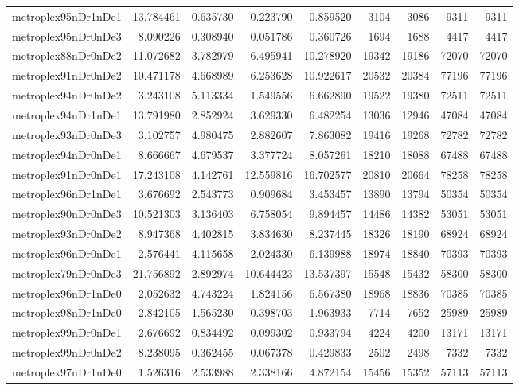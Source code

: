 \begin{longtable}{|l|r|r|r|r|r|r|r|r|}
metroplex95nDr1nDe1 & 13.784461 & 0.635730 & 0.223790 & 0.859520 & 3104 & 3086 & 9311 & 9311 \\
metroplex95nDr0nDe3 & 8.090226 & 0.308940 & 0.051786 & 0.360726 & 1694 & 1688 & 4417 & 4417 \\
metroplex88nDr0nDe2 & 11.072682 & 3.782979 & 6.495941 & 10.278920 & 19342 & 19186 & 72070 & 72070 \\
metroplex91nDr0nDe2 & 10.471178 & 4.668989 & 6.253628 & 10.922617 & 20532 & 20384 & 77196 & 77196 \\
metroplex94nDr0nDe2 & 3.243108 & 5.113334 & 1.549556 & 6.662890 & 19522 & 19380 & 72511 & 72511 \\
metroplex94nDr1nDe1 & 13.791980 & 2.852924 & 3.629330 & 6.482254 & 13036 & 12946 & 47084 & 47084 \\
metroplex93nDr0nDe3 & 3.102757 & 4.980475 & 2.882607 & 7.863082 & 19416 & 19268 & 72782 & 72782 \\
metroplex94nDr0nDe1 & 8.666667 & 4.679537 & 3.377724 & 8.057261 & 18210 & 18088 & 67488 & 67488 \\
metroplex91nDr0nDe1 & 17.243108 & 4.142761 & 12.559816 & 16.702577 & 20810 & 20664 & 78258 & 78258 \\
metroplex96nDr1nDe1 & 3.676692 & 2.543773 & 0.909684 & 3.453457 & 13890 & 13794 & 50354 & 50354 \\
metroplex90nDr0nDe3 & 10.521303 & 3.136403 & 6.758054 & 9.894457 & 14486 & 14382 & 53051 & 53051 \\
metroplex93nDr0nDe2 & 8.947368 & 4.402815 & 3.834630 & 8.237445 & 18326 & 18190 & 68924 & 68924 \\
metroplex96nDr0nDe1 & 2.576441 & 4.115658 & 2.024330 & 6.139988 & 18974 & 18840 & 70393 & 70393 \\
metroplex79nDr0nDe3 & 21.756892 & 2.892974 & 10.644423 & 13.537397 & 15548 & 15432 & 58300 & 58300 \\
metroplex96nDr1nDe0 & 2.052632 & 4.743224 & 1.824156 & 6.567380 & 18968 & 18836 & 70385 & 70385 \\
metroplex98nDr1nDe0 & 2.842105 & 1.565230 & 0.398703 & 1.963933 & 7714 & 7652 & 25989 & 25989 \\
metroplex99nDr0nDe1 & 2.676692 & 0.834492 & 0.099302 & 0.933794 & 4224 & 4200 & 13171 & 13171 \\
metroplex99nDr0nDe2 & 8.238095 & 0.362455 & 0.067378 & 0.429833 & 2502 & 2498 & 7332 & 7332 \\
metroplex97nDr1nDe0 & 1.526316 & 2.533988 & 2.338166 & 4.872154 & 15456 & 15352 & 57113 & 57113 \\

\end{longtable}
